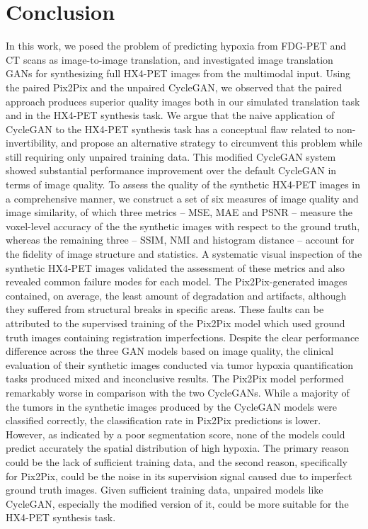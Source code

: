 \chapter{Conclusion}
\label{Conclusion}

In this work, we posed the problem of predicting hypoxia from FDG-PET and CT scans as image-to-image translation, and investigated image translation GANs for synthesizing full HX4-PET images from the multimodal input. Using the paired Pix2Pix and the unpaired CycleGAN, we observed that the paired approach produces superior quality images both in our simulated translation task and in the HX4-PET synthesis task. We argue that the naive application of CycleGAN to the HX4-PET synthesis task has a conceptual flaw related to non-invertibility, and propose an alternative strategy to circumvent this problem while still requiring only unpaired training data. This modified CycleGAN system showed substantial performance improvement over the default CycleGAN in terms of image quality. To assess the quality of the synthetic HX4-PET images in a comprehensive manner, we construct a set of six measures of image quality and image similarity, of which three metrics -- MSE, MAE and PSNR -- measure the voxel-level accuracy of the the synthetic images with respect to the ground truth, whereas the remaining three -- SSIM, NMI and histogram distance -- account for the fidelity of image structure and statistics. A systematic visual inspection of the synthetic HX4-PET images validated the assessment of these metrics and also revealed common failure modes for each model. The Pix2Pix-generated images contained, on average, the least amount of degradation and artifacts, although they suffered from structural breaks in specific areas. These faults can be attributed to the supervised training of the Pix2Pix model which used ground truth images containing registration imperfections. Despite the clear performance difference across the three GAN models based on image quality, the clinical evaluation of their synthetic images conducted via tumor hypoxia quantification tasks produced mixed and inconclusive results. The Pix2Pix model performed remarkably worse in comparison with the two CycleGANs. While a majority of the tumors in the synthetic images produced by the CycleGAN models were classified correctly, the classification rate in Pix2Pix predictions is lower. However, as indicated by a poor segmentation score, none of the models could predict accurately the spatial distribution of high hypoxia. The primary reason could be the lack of sufficient training data, and the second reason, specifically for Pix2Pix, could be the noise in its supervision signal caused due to imperfect ground truth images. Given sufficient training data, unpaired models like CycleGAN, especially the modified version of it, could be more suitable for the HX4-PET synthesis task.
